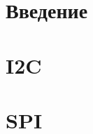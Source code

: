 \documentclass[a4paper]{report}
\begin{document}

\newenvironment{Titul}
{
    \begin{center}}{\end{center}
    \baselineskip 12pt
    \addtolength{\textheight}{-14mm}
}

\newenvironment{Anot}
{
    \begin{quote}\settowidth{\parindent}{~~~}\scriptsize\mbox{~~~}}{\end{quote}
}


\pagebreak

\tableofcontents
\pagebreak


\chapter{Введение}


\chapter{I2C}


\chapter{SPI}

\end{document}
